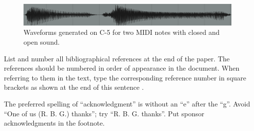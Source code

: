 \documentclass{article}
\begin{document}
\begin{sloppy}
\begin{figure}[t]
  \centering
  \centerline{\includegraphics[scale=0.32]{generated_waveform}}
  \caption{Waveforms generated on C-5 for two MIDI notes with closed and open sound.}
  \label{fig:generated_waveform}
\end{figure}



List and number \cite{IEEEPDFSpec} all bibliographical references at the end of the paper. The references should be numbered in order of appearance in the document. When referring to them in the text, type the corresponding reference number in square brackets as shown at the end of this sentence .

The preferred spelling of ``acknowledgment'' is without an “e” after the “g”. Avoid ``One of us (R. B. G.) thanks''; try ``R. B. G. thanks''. Put sponsor acknowledgments in the footnote.



% 


{\footnotesize}

% 

\end{sloppy}
\end{document}
